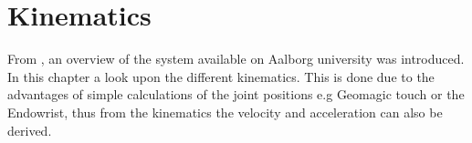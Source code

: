\chapter{Kinematics}\label{cha:kinematic}

From , an overview of the system available on Aalborg university was introduced. In this chapter a look upon the different kinematics. This is done due to the advantages of simple calculations of the joint positions e.g Geomagic touch or the Endowrist, thus from the kinematics the velocity  and acceleration can also be derived. 





